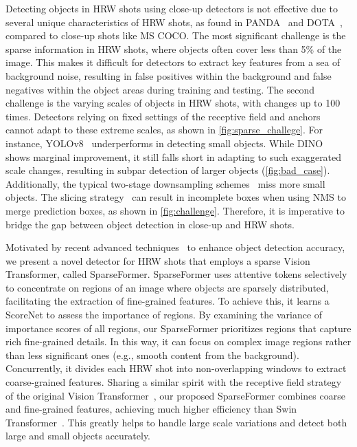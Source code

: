 Detecting objects in HRW shots using close-up detectors is not effective due to several unique characteristics of HRW shots, as found in PANDA~\cite{wang2020panda} and DOTA~\cite{xia2018dota}, compared to close-up shots like MS COCO. The most significant challenge is the sparse information in HRW shots, where objects often cover less than 5\% of the image. This makes it difficult for detectors to extract key features from a sea of background noise, resulting in false positives within the background and false negatives within the object areas during training and testing. 
%
The second challenge is the varying scales of objects in HRW shots, with changes up to 100 times. Detectors relying on fixed settings of the receptive field and anchors cannot adapt to these extreme scales, as shown in \cref{fig:sparse_challege}. For instance, YOLOv8~\cite{yolov8} underperforms in detecting small objects. While DINO~\cite{zhang2022dino} shows marginal improvement, it still falls short in adapting to such exaggerated scale changes, resulting in subpar detection of larger objects (\cref{fig:bad_case}). 
%
Additionally, the typical two-stage downsampling schemes~\cite{najibi2019autofocus, chen2022towards, fan2022speed, li2020density} miss more small objects. The slicing strategy~\cite{akyon2022sahi} can result in incomplete boxes when using NMS to merge prediction boxes, as shown in \cref{fig:challenge}. Therefore, it is imperative to bridge the gap between object detection in close-up and HRW shots.


Motivated by recent advanced techniques~\cite{meng2022adavit,rao2021dynamicvit, wang2022efficient,yang2022querydet, wang2021pnp, song2021dynamic} to enhance object detection accuracy, we present a novel detector for HRW shots that employs a sparse Vision Transformer, called SparseFormer.
%
SparseFormer uses attentive tokens selectively to concentrate on regions of an image where objects are sparsely distributed, facilitating the extraction of fine-grained features. 
To achieve this, it learns a ScoreNet to assess the importance of regions. By examining the variance of importance scores of all regions, our SparseFormer prioritizes regions that capture rich fine-grained details. In this way, it can focus on complex image regions rather than less significant ones (e.g., smooth content from the background). 
%
Concurrently, it divides each HRW shot into non-overlapping windows to extract coarse-grained features. 
Sharing a similar spirit with the receptive field strategy of the original Vision Transformer~\cite{dosovitskiy2020image}, our proposed SparseFormer combines coarse and fine-grained features, achieving much higher efficiency than Swin Transformer~\cite{liu2021swin}. This greatly helps to handle large scale variations and detect both large and small objects accurately. %


